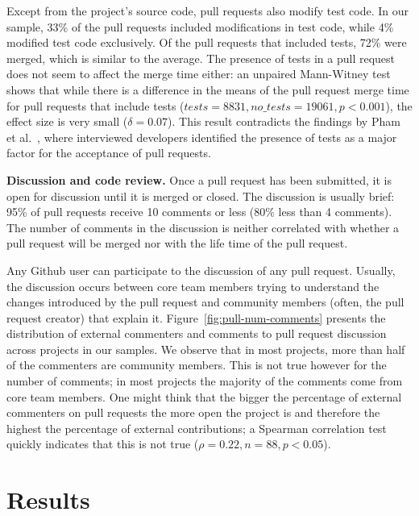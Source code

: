 \documentclass{acm_proc_article-sp}
\begin{document}
Except from the project's source code, pull requests also modify test code. In
our sample, 33\% of the pull requests included modifications in test code, while
4\% modified test code exclusively. Of the pull requests that included tests,
72\% were merged, which is similar to the average. The presence of tests in a
pull request does not seem to affect the merge time either: an unpaired
Mann-Witney test shows that while there is a difference in the means of the pull
request merge time for pull requests that include tests ($tests = 8831, no\_tests
= 19061, p < 0.001$), the effect size is very small ($\delta = 0.07$). This
result contradicts the findings by Pham et al.~\cite{Pham13}, where
interviewed developers identified the presence of tests as a major factor for
the acceptance of pull requests.



\textbf{Discussion and code review.}
Once a pull request has been submitted, it is open for discussion until
it is merged or closed. The discussion is usually brief: 95\% of pull
requests receive 10 comments or less (80\% less than 4 comments). 
The number of comments in the discussion is neither correlated with
whether a pull request will be merged nor with the life time of the
pull request.

Any Github user can participate to the discussion of any pull request. Usually,
the discussion occurs between core team members trying to understand the changes
introduced by the pull request and community members (often, the pull
request creator) that explain it. Figure~\ref{fig:pull-num-comments} presents
the distribution of external commenters and comments to pull request discussion
across projects in our samples. We observe that in most projects, more than half
of the commenters are community members. This is not true however for the number
of comments; in most projects the majority of the comments come from core team
members. One might think that the bigger the percentage of external commenters
on pull requests the more open the project is and therefore the highest the
percentage of external contributions; a Spearman correlation test quickly
indicates that this is not true ($\rho = 0.22, n = 88, p < 0.05$).

\section{Results}
\label{sec:accrej}
\end{document}
